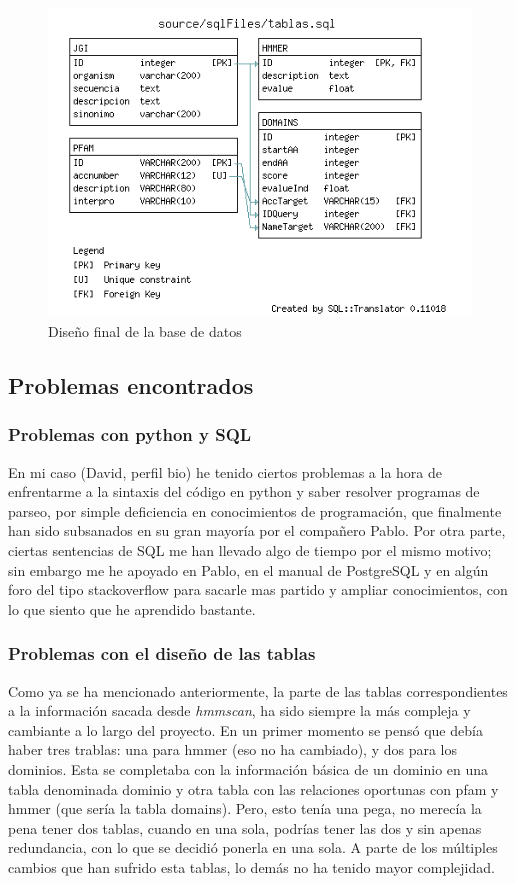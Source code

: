 \documentclass[11pt]{article} %
\begin{document}
\begin{figure}
\centering
\includegraphics[width=15cm]{design}
\caption{Dise\~no final de la base de datos\label{fig:Design}}
\end{figure}

\subsection{Problemas encontrados}

\subsubsection{Problemas con python y SQL}

En mi caso (David, perfil bio) he tenido ciertos problemas a la hora de enfrentarme a la sintaxis del código en python y saber resolver programas de parseo, por simple deficiencia en conocimientos de programación, que finalmente han sido subsanados en su gran mayoría por el compañero Pablo. Por otra parte, ciertas sentencias de SQL me han llevado algo de tiempo por el mismo motivo; sin embargo me he apoyado en Pablo, en el manual de PostgreSQL y en algún foro del tipo stackoverflow para sacarle mas partido y ampliar conocimientos, con lo que siento que he aprendido bastante.

\subsubsection{Problemas con el dise\~no de las tablas}

Como ya se ha mencionado anteriormente, la parte de las tablas correspondientes a la informaci\'on sacada desde \emph{hmmscan}, ha sido siempre la m\'as compleja y cambiante a lo largo del proyecto. En un primer momento se pens\'o que deb\'ia haber tres trablas: una para hmmer (eso no ha cambiado), y dos para los dominios. Esta se completaba con la informaci\'on b\'asica de un dominio en una tabla denominada dominio y otra tabla con las relaciones oportunas con pfam y hmmer (que ser\'ia la tabla domains). Pero, esto ten\'ia una pega, no merec\'ia la pena tener dos tablas, cuando en una sola, podr\'ias tener las dos y sin apenas redundancia, con lo que se decidi\'o ponerla en una sola.
A parte de los m\'ultiples cambios que han sufrido esta tablas, lo dem\'as no ha tenido mayor complejidad. 
\end{document}

